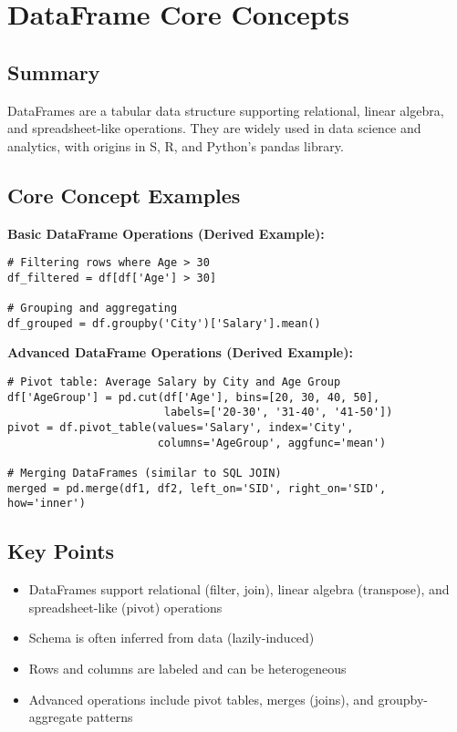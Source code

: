 \documentclass{article}
\begin{document}
\section*{DataFrame Core Concepts}

\subsection*{Summary}
DataFrames are a tabular data structure supporting relational, linear algebra, and spreadsheet-like operations. They are widely used in data science and analytics, with origins in S, R, and Python's pandas library.

\subsection*{Core Concept Examples}

\textbf{Basic DataFrame Operations (Derived Example):}
\begin{verbatim}
# Filtering rows where Age > 30
df_filtered = df[df['Age'] > 30]

# Grouping and aggregating
df_grouped = df.groupby('City')['Salary'].mean()
\end{verbatim}

\textbf{Advanced DataFrame Operations (Derived Example):}
\begin{verbatim}
# Pivot table: Average Salary by City and Age Group
df['AgeGroup'] = pd.cut(df['Age'], bins=[20, 30, 40, 50], 
                        labels=['20-30', '31-40', '41-50'])
pivot = df.pivot_table(values='Salary', index='City', 
                       columns='AgeGroup', aggfunc='mean')

# Merging DataFrames (similar to SQL JOIN)
merged = pd.merge(df1, df2, left_on='SID', right_on='SID', how='inner')
\end{verbatim}

\subsection*{Key Points}
\begin{itemize}
    \item DataFrames support relational (filter, join), linear algebra (transpose), and spreadsheet-like (pivot) operations
    \item Schema is often inferred from data (lazily-induced)
    \item Rows and columns are labeled and can be heterogeneous
    \item Advanced operations include pivot tables, merges (joins), and groupby-aggregate patterns
\end{itemize}
\end{document}
